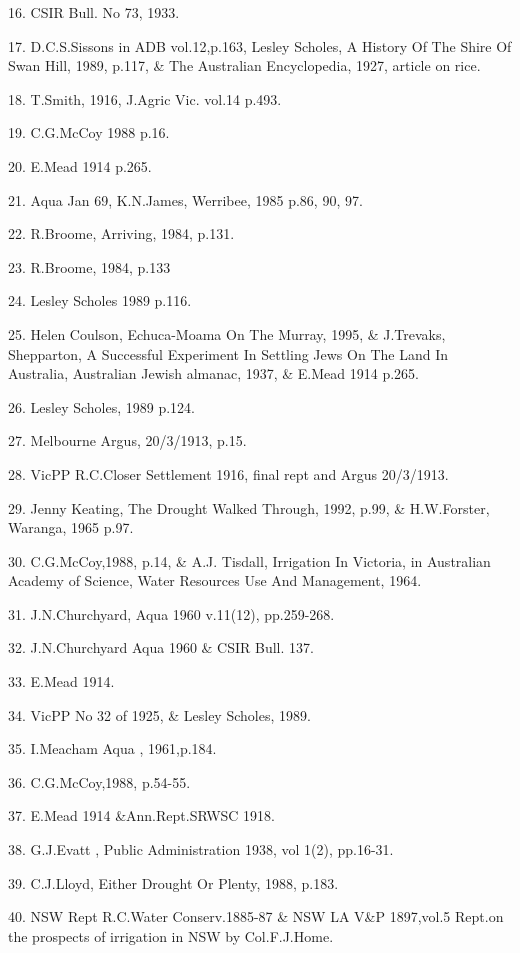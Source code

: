 16. CSIR Bull. No 73, 1933.

17. D.C.S.Sissons in ADB vol.12,p.163,  Lesley Scholes, A History Of
      The Shire Of Swan Hill, 1989, p.117, \& The Australian Encyclopedia,
      1927, article on rice.

18. T.Smith, 1916, J.Agric Vic. vol.14 p.493. 

19. C.G.McCoy 1988 p.16.

20. E.Mead 1914 p.265.

21. Aqua Jan 69, K.N.James, Werribee, 1985 p.86, 90, 97.

22. R.Broome, Arriving, 1984, p.131.

23. R.Broome, 1984,  p.133

24. Lesley Scholes 1989 p.116.

25. Helen Coulson, Echuca-Moama On The Murray, 1995, \& J.Trevaks,
      Shepparton, A Successful Experiment In Settling Jews On The Land
      In Australia, Australian Jewish almanac, 1937, \& E.Mead 1914 p.265.

26. Lesley Scholes, 1989 p.124.

27. Melbourne Argus, 20/3/1913, p.15.

28. VicPP R.C.Closer Settlement 1916, final rept and Argus 20/3/1913.

29. Jenny Keating, The Drought Walked Through, 1992, p.99, \& H.W.Forster,
     Waranga, 1965  p.97.

30. C.G.McCoy,1988, p.14, \& A.J. Tisdall, Irrigation In Victoria, in
       Australian Academy of Science,  Water Resources Use And Management,
       1964.   

31. J.N.Churchyard, Aqua 1960 v.11(12), pp.259-268.

32. J.N.Churchyard Aqua 1960 \& CSIR Bull. 137.

33. E.Mead 1914.

34. VicPP No 32 of 1925, \& Lesley Scholes, 1989.

35. I.Meacham  Aqua , 1961,p.184.

36. C.G.McCoy,1988,  p.54-55.

37. E.Mead 1914 \&Ann.Rept.SRWSC 1918.

38. G.J.Evatt , Public Administration 1938, vol 1(2), pp.16-31.

39. C.J.Lloyd, Either Drought Or Plenty, 1988, p.183.

40. NSW Rept R.C.Water Conserv.1885-87 \& NSW LA V\&P 1897,vol.5 
      Rept.on the prospects of irrigation  in NSW by Col.F.J.Home. 

